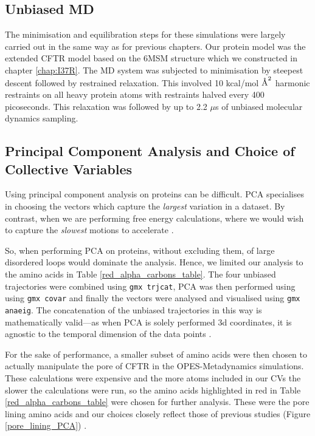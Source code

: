 \subsection{Unbiased MD }
The minimisation and equilibration steps for these simulations were largely carried out in the same way as for previous chapters. Our protein model was the extended CFTR model based on the 6MSM structure \cite{zhang2018} which we constructed in chapter \ref{chap:I37R}. The MD system was subjected to minimisation by steepest descent followed by restrained relaxation. This involved 10 kcal/mol $\textup{\AA}^2$ harmonic restraints on all heavy protein atoms with restraints halved every 400 picoseconds. This relaxation was followed by up to 2.2 $\mu$s of unbiased molecular dynamics sampling.

\subsection {Principal Component Analysis and Choice of Collective Variables}
\label {supp_cv_choice}
Using principal component analysis on proteins can be difficult. PCA specialises in choosing the vectors which capture the \textit{largest} variation in a dataset. By contrast, when we are performing free energy calculations, where we would wish to capture the \textit{slowest} motions to accelerate \cite{noe2001}. 

So, when performing PCA on proteins, without excluding them, of large disordered loops would dominate the analysis. Hence, we limited our analysis to the amino acids in Table \ref{red_alpha_carbons_table}. The four unbiased trajectories were combined using \verb_gmx trjcat_, PCA was then performed using using \verb_gmx covar_ and finally the vectors were analysed and visualised using \verb_gmx anaeig_. The concatenation of the unbiased trajectories in this way is mathematically valid---as when PCA is solely performed 3d coordinates, it is agnostic to the temporal dimension of the data points \cite{grus2015}.

For the sake of performance, a smaller subset of amino acids were then chosen to actually manipulate the pore of CFTR in the OPES-Metadynamics simulations. These calculations were expensive and the more atoms included in our CVs the slower the calculations were run, so the amino acids highlighted in red in Table \ref{red_alpha_carbons_table} were chosen for further analysis. These were the pore lining amino acids and our choices closely reflect those of previous studies (Figure \ref{pore_lining_PCA}) \cite{hoffmann2018}. 

